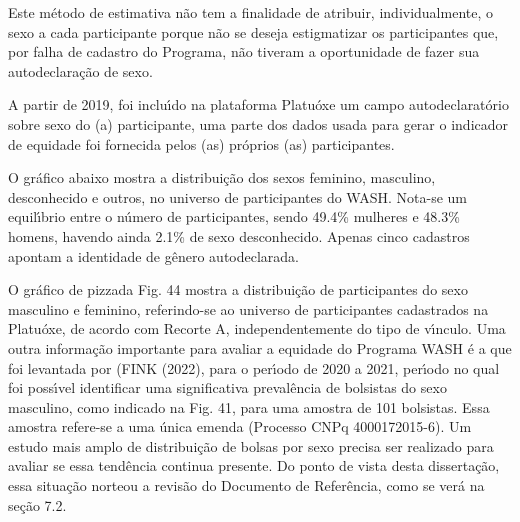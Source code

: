 \documentclass[
12pt,		%
openright,	%
twoside,  %
a4paper,			%
chapter=TITLE,		%
english,			%
french,				%
spanish,			%
brazil				%
]{USPSC-classe/USPSC}
\begin{document}
Este m\'etodo de \textquotedbl  estimativa \textquotedbl  n\~ao tem a finalidade de atribuir, individualmente, o sexo a cada participante porque n\~ao se deseja estigmatizar os participantes que, por falha de cadastro do Programa, n\~ao tiveram a oportunidade de fazer sua autodeclara\c{c}\~ao de sexo.









A partir de 2019, foi inclu\'{\i}do na plataforma Platu\'oxe um campo autodeclarat\'orio sobre sexo do (a) participante, uma parte dos dados usada para gerar o indicador de equidade foi fornecida pelos (as) pr\'oprios (as) participantes.









O gr\'afico abaixo mostra a distribui\c{c}\~ao dos sexos feminino, masculino,  desconhecido e outros, no universo de participantes do WASH. Nota-se um equil\'{\i}brio entre o n\'umero de participantes, sendo 49.4\%  mulheres e 48.3\% homens, havendo ainda 2.1\% de sexo desconhecido. Apenas cinco cadastros apontam a identidade de g\^enero autodeclarada.









O gr\'afico de \textquotedbl pizza\textquotedbl  da Fig. 44 mostra a distribui\c{c}\~ao de participantes do sexo masculino e feminino, referindo-se ao universo de participantes cadastrados na Platu\'oxe, de acordo com Recorte A, independentemente do tipo de v\'{\i}nculo. Uma outra informa\c{c}\~ao importante para avaliar a equidade do Programa  WASH \'e a que foi levantada por (FINK (2022), para o per\'{\i}odo de 2020 a 2021, per\'{\i}odo no qual foi poss\'{\i}vel identificar uma significativa preval\^encia de bolsistas do sexo masculino, como indicado na Fig. 41, para uma amostra de 101 bolsistas. Essa amostra refere-se a uma \'unica emenda (Processo CNPq 4000172015-6). Um estudo mais amplo de distribui\c{c}\~ao de bolsas por sexo precisa ser realizado para avaliar se essa tend\^encia continua presente. Do ponto de vista desta disserta\c{c}\~ao, essa situa\c{c}\~ao norteou a revis\~ao do Documento de Refer\^encia, como se ver\'a na se\c{c}\~ao 7.2.
\end{document}
